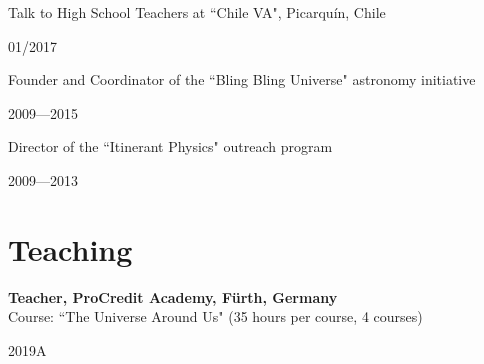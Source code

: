 \documentclass[12pt, a4paper]{article} %
\begin{document}
\begin{minipage}[t]{0.7\textwidth}
\begin{flushleft}%
  \setlength{\leftskip}{0.2cm}%
Talk to High School Teachers at ``Chile VA", Picarqu\'in, Chile
\end{flushleft}
\end{minipage}
\begin{minipage}[t]{0.3\textwidth}
\hfill 01/2017
\end{minipage}


\begin{minipage}[t]{0.8\textwidth}
\begin{flushleft}%
  \setlength{\leftskip}{0.2cm}%
Founder and Coordinator of the ``Bling Bling Universe" astronomy initiative
\end{flushleft}
\end{minipage}
\begin{minipage}[t]{0.2\textwidth}
\hfill 2009---2015
\end{minipage}


\begin{minipage}[t]{0.7\textwidth}
\begin{flushleft}%
  \setlength{\leftskip}{0.2cm}%
Director of the ``Itinerant Physics" outreach program
\end{flushleft}
\end{minipage}
\begin{minipage}[t]{0.3\textwidth}
\hfill 2009---2013
\end{minipage}

\section*{Teaching}

\begin{minipage}[t]{0.7\textwidth}
\begin{flushleft}%
  \setlength{\leftskip}{0.2cm}%
\textbf{Teacher, ProCredit Academy, F\"urth, Germany}\\
Course: ``The Universe Around Us" (35 hours per course, 4 courses)
\end{flushleft}
\end{minipage}
\begin{minipage}[t]{0.3\textwidth}
\hfill 2019A
\end{minipage}\\
\end{document}

